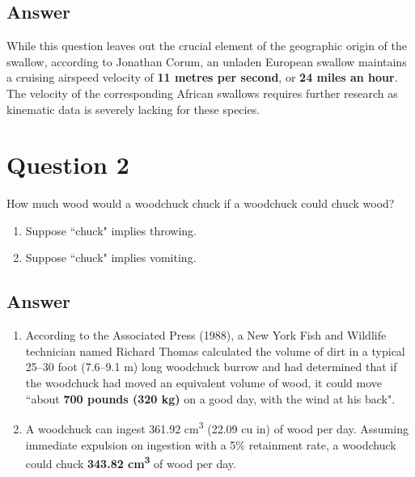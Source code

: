 \documentclass[
	12pt, %
]{fphw}
\begin{document}

\subsection*{Answer}

While this question leaves out the crucial element of the geographic origin of the swallow, according to Jonathan Corum, an unladen European swallow maintains a cruising airspeed velocity of \textbf{11 metres per second}, or \textbf{24 miles an hour}. The velocity of the corresponding African swallows requires further research as kinematic data is severely lacking for these species.


\section*{Question 2}

\begin{problem}
	How much wood would a woodchuck chuck if a woodchuck could chuck wood?
	
	\medskip
	
	\begin{enumerate} %
		\item Suppose ``chuck" implies throwing.
		\item Suppose ``chuck" implies vomiting.
	\end{enumerate}
\end{problem}


\subsection*{Answer}

\begin{enumerate} %
	\item According to the Associated Press (1988), a New York Fish and Wildlife technician named Richard Thomas calculated the volume of dirt in a typical 25--30 foot (7.6--9.1 m) long woodchuck burrow and had determined that if the woodchuck had moved an equivalent volume of wood, it could move ``about \textbf{700 pounds (320 kg)} on a good day, with the wind at his back".
    
	\item A woodchuck can ingest 361.92 cm\textsuperscript{3} (22.09 cu in) of wood per day. Assuming immediate expulsion on ingestion with a 5\% retainment rate, a woodchuck could chuck \textbf{343.82 cm\textsuperscript{3}} of wood per day.
\end{enumerate}
\end{document}
